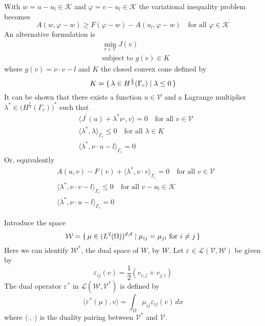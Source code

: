 \documentclass[12pt,a4paper]{article}
\numberwithin{equation}{section}
\numberwithin{table}{section}
\numberwithin{figure}{section}
\newcommand{\W}{\ensuremath{\mathcal{W}}}
\newcommand{\half}{\ensuremath{\frac{1}{2}}}
\newcommand{\V}{\ensuremath{\mathcal{V}}}
\newcommand{\K}{\ensuremath{\mathcal{K}}}
\renewcommand{\L}{{\mathcal L}}
\newcommand{\intO}{\int_\Omega\!\!}
\renewcommand{\epsilon}{\varepsilon}
\renewcommand{\phi}{\varphi}
\newcommand{\strain}[1][]{\ensuremath{\epsilon_{#1}}}
\newcommand{\epsij}{\strain[ij]}
\providecommand{\dualp}[2]{\langle #1, #2 \rangle}
\newcommand{\dx}{{\,dx}}
\begin{document}
With $w=u-u_l\in \K$ and $\phi=v-u_l \in \K$ the variational inequality problem becomes
\begin{equation}
  A(w, \phi-w) \ge F(\phi-w) - A(u_l, \phi-w) \quad\text{for all $\phi\in\K$}
\end{equation}
An alternative formulation is
\begin{equation}
  \begin{split}
    &\min_{v\in\V} J(v) \\
    &\text{subject to $g(v) \in K$}
  \end{split}
\end{equation}
where $g(v) = \nu\cdot v - l$ and $K$ the closed convex cone defined by
\begin{equation}
  K = \set{\lambda \in H^\half(\Gamma_c) | \lambda \le 0}
\end{equation}
It can be shown that there exists a function $u\in\V$ and a Lagrange multiplier
$\lambda^* \in \bigl(H^{\half}(\Gamma_c)\bigr)^*$ such that
\begin{align}
  &\dualp{J^\prime(u) + \lambda^* \nu\cdot}{v} = 0 \quad\text{for all $v\in \V$} \\
  &\dualp{\lambda^*}{\lambda}_{\Gamma_c} \le 0 \quad\text{for all $\lambda\in K$} \\
  &\dualp{\lambda^*}{\nu\cdot u - l}_{\Gamma_c} = 0
\end{align}
Or, equivalently
\begin{align}
  & A(u,v) - F(v) + \dualp{\lambda^*}{\nu\cdot v}_{\Gamma_c} = 0
  \quad\text{for all $v\in \V$} \\
  &\dualp{\lambda^*}{\nu\cdot v - l}_{\Gamma_c} \le 0 \quad\text{for all $v-u_l\in \K$} \\
  &\dualp{\lambda^*}{\nu\cdot u - l}_{\Gamma_c} = 0
\end{align}

Introduce the space
\begin{equation}
  \W = \set{\mu \in (L^2(\Omega))^{d,d} | \mu_{ij} = \mu_{ji}
    \text{ for } i\ne j } 
\end{equation}
Here we can identify $\W^*$, the dual space of $W$, by $W$.  Let $\strain \in \L(\V,\W)$
be given by
\begin{equation}
  \epsij(v) = \half (v_{i,j} + v_{j,i})
\end{equation}
The dual operator
$\strain^*$ in $\L(\W,\V^*)$ is defined by
\begin{equation}
  \dualp{\strain^*(\mu)}{v} = \intO \mu_{ij} \epsij(v) \dx
\end{equation}
where $\dualp{\cdot}{\cdot}$ is the duality pairing between $\V^*$ and
$\V$.  
\end{document}

